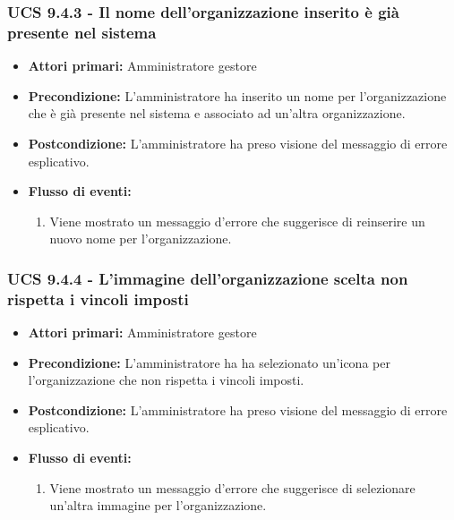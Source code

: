 \subsubsection{UCS 9.4.3 - Il nome dell'organizzazione inserito è già presente nel sistema}%
\begin{itemize}
\item \textbf{Attori primari:} Amministratore gestore
\item \textbf{Precondizione:} L'amministratore ha inserito un nome per l'organizzazione che è già presente nel sistema e associato ad un'altra organizzazione.
\item \textbf{Postcondizione:} L'amministratore ha preso visione del messaggio di errore esplicativo.
\item \textbf{Flusso di eventi:}
    \begin{enumerate}
    \item Viene mostrato un messaggio d'errore che suggerisce di reinserire un nuovo nome per l'organizzazione.
    \end{enumerate} 
\end{itemize}

\subsubsection{UCS 9.4.4 - L'immagine dell'organizzazione scelta non rispetta i vincoli imposti}%
\begin{itemize}
\item \textbf{Attori primari:} Amministratore gestore
\item \textbf{Precondizione:} L'amministratore ha ha selezionato un'icona per l'organizzazione che non rispetta i vincoli imposti.
\item \textbf{Postcondizione:} L'amministratore ha preso visione del messaggio di errore esplicativo.
\item \textbf{Flusso di eventi:}
    \begin{enumerate}
    \item Viene mostrato un messaggio d'errore che suggerisce di selezionare un'altra immagine per l'organizzazione.
    \end{enumerate} 
\end{itemize}

